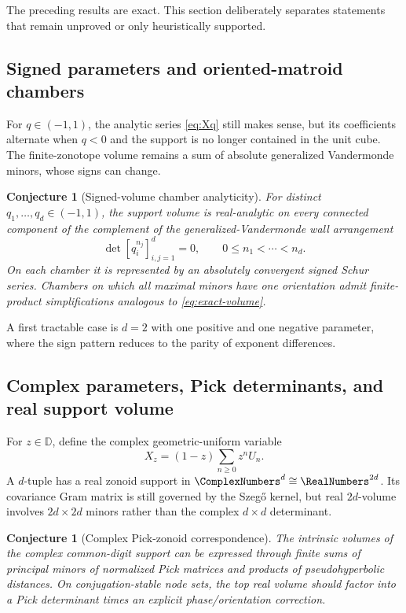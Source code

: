 \documentclass[11pt,a4paper]{article}
\newtheorem{conjecture}[theorem]{Conjecture}
\theoremstyle{definition}
\theoremstyle{remark}
\begin{document}
The preceding results are exact.  This section deliberately separates statements that remain unproved or only heuristically supported.

\subsection{Signed parameters and oriented-matroid chambers}

For $q\in(-1,1)$, the analytic series \eqref{eq:Xq} still makes sense, but its coefficients alternate when $q<0$ and the support is no longer contained in the unit cube.  The finite-zonotope volume remains a sum of absolute generalized Vandermonde minors, whose signs can change.

\begin{conjecture}[Signed-volume chamber analyticity]
\label{conj:signed-chambers}
For distinct $q_1,\ldots,q_d\in(-1,1)$, the support volume is real-analytic on every connected component of the complement of the generalized-Vandermonde wall arrangement
\begin{equation}
  \det[q_i^{n_j}]_{i,j=1}^d=0,
  \qquad 0\le n_1<\cdots<n_d.
  \label{eq:signed-walls}
\end{equation}
On each chamber it is represented by an absolutely convergent signed Schur series.  Chambers on which all maximal minors have one orientation admit finite-product simplifications analogous to \eqref{eq:exact-volume}.
\end{conjecture}

A first tractable case is $d=2$ with one positive and one negative parameter, where the sign pattern reduces to the parity of exponent differences.

\subsection{Complex parameters, Pick determinants, and real support volume}

For $z\in\mathbb D$, define the complex geometric-uniform variable
\begin{equation}
  X_z=(1-z)\sum_{n\ge0}z^nU_n.
  \label{eq:complex-X}
\end{equation}
A $d$-tuple has a real zonoid support in $\ComplexNumbers^d\cong\RealNumbers^{2d}$.  Its covariance Gram matrix is still governed by the Szeg\H{o} kernel, but real $2d$-volume involves $2d\times2d$ minors rather than the complex $d\times d$ determinant.

\begin{conjecture}[Complex Pick-zonoid correspondence]
\label{conj:complex-zonoid}
The intrinsic volumes of the complex common-digit support can be expressed through finite sums of principal minors of normalized Pick matrices and products of pseudohyperbolic distances.  On conjugation-stable node sets, the top real volume should factor into a Pick determinant times an explicit phase/orientation correction.
\end{conjecture}
\end{document}
